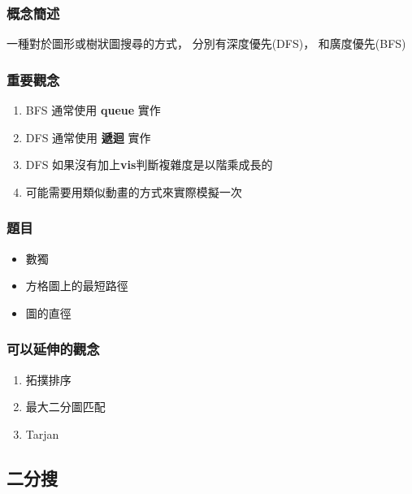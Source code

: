 \documentclass[12pt,oneside]{article}
\begin{document}
\subsubsection*{概念簡述}
一種對於圖形或樹狀圖搜尋的方式，
分別有深度優先(DFS)，
和廣度優先(BFS)


\subsubsection*{重要觀念}
\begin{adjustwidth}{2em}{0em}
\begin{enumerate}
    \item BFS 通常使用 \textbf{queue} 實作
    \item DFS 通常使用 \textbf{遞迴} 實作
    \item DFS 如果沒有加上\textbf{vis}判斷複雜度是以階乘成長的
    \item 可能需要用類似動畫的方式來實際模擬一次
\end{enumerate}
\end{adjustwidth}



\subsubsection*{題目}
\begin{adjustwidth}{2em}{0em}
\begin{itemize}
    \item 數獨
    \item 方格圖上的最短路徑
    \item 圖的直徑
\end{itemize}
\end{adjustwidth}

\subsubsection*{可以延伸的觀念}
\begin{adjustwidth}{2em}{0em}
\begin{enumerate}
    \item 拓撲排序
    \item 最大二分圖匹配
    \item Tarjan
\end{enumerate}
\end{adjustwidth}

\clearpage
\subsection{二分搜}
\end{document}
